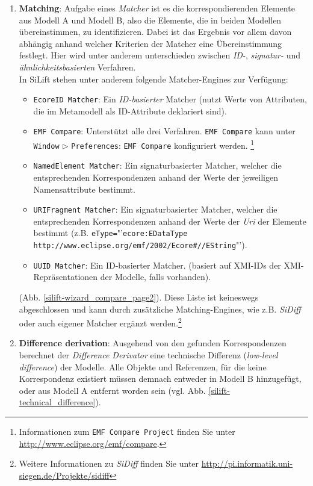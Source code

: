 \begin{enumerate}
\item \textbf{Matching}: Aufgabe eines \textit{Matcher} ist es die korrespondierenden Elemente aus Modell A und Modell B, also die Elemente, die in beiden Modellen übereinstimmen, zu identifizieren.
Dabei ist das Ergebnis vor allem davon abhängig anhand welcher Kriterien der Matcher eine Übereinstimmung festlegt.
Hier wird unter anderem unterschieden zwischen \textit{ID-}, \textit{signatur-} und \textit{ähnlichkeitsbasierten} Verfahren.\\
In SiLift stehen unter anderem folgende Matcher-Engines zur Verfügung:

\begin{itemize}
	\item \texttt{EcoreID Matcher}: Ein \textit{ID-basierter} Matcher (nutzt Werte von Attributen, die im Metamodell als ID-Attribute deklariert sind).
	\item \texttt{EMF Compare}: Unterstützt alle drei Verfahren. \texttt{EMF Compare} kann unter \texttt{Win\-dow} $\triangleright$ \texttt{Preferences}: \texttt{EMF Compare} konfiguriert werden. \footnote{Informationen zum \texttt{EMF Compare Project} finden Sie unter \url{http://www.eclipse.org/emf/compare}.}
	
	\item \texttt{NamedElement Matcher}: Ein signaturbasierter Matcher, welcher die ent\-sprech\-enden Korrespondenzen anhand der Werte der jeweiligen Namensattribute bestimmt.
	
	\item \texttt{URIFragment Matcher}: Ein signaturbasierter Matcher, welcher die ent\-sprech\-enden Korrespondenzen anhand der Werte der \textit{Uri} der Elemente bestimmt (z.B. \texttt{eType=}"'\texttt{ecore:EDataType http://www.eclipse.org/emf/2002/\-E\-core\-\#//EString}"').
	
	\item \texttt{UUID Matcher}: Ein ID-basierter Matcher. (basiert auf XMI-IDs der XMI-Repräsentationen der Modelle, falls vorhanden).
\end{itemize}
(Abb. \ref{silift-wizard_compare_page2}).
Diese Liste ist keineswegs abgeschlossen und kann durch zusätzliche Matching-Engines, wie z.B. \textit{SiDiff} oder auch eigener Matcher ergänzt werden.\footnote{Weitere Informationen zu \textit{SiDiff} finden Sie unter \url{http://pi.informatik.uni-siegen.de/Projekte/sidiff}}\\

\item \textbf{Difference derivation}: Ausgehend von den gefunden Korrespondenzen berechnet der \textit{Difference Derivator} eine technische Differenz (\textit{low-level difference}) der Mo\-del\-le.
Alle Objekte und Referenzen, für die keine Korrespondenz existiert müssen demnach entweder in Modell B hinzugefügt, oder aus Modell A entfernt worden sein (vgl. Abb. \ref{silift-technical_difference}).


\end{enumerate}
